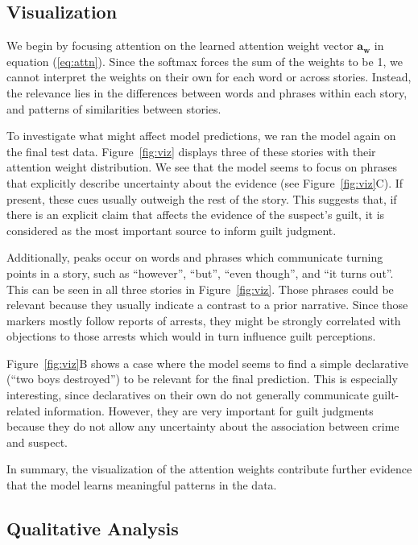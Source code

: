 \documentclass[11pt,a4paper]{article}
\begin{document}
\subsection{Visualization}

We begin by focusing attention on the learned attention weight vector $\mathbf{a_{w}}$ in equation (\ref{eq:attn}). Since the softmax forces the sum of the weights to be 1, we cannot interpret the weights on their own for each word or across stories. Instead, the relevance lies in the differences between words and phrases within each story, and patterns of similarities between stories.

To investigate what might affect model predictions, we ran the model again on the final test data. Figure~\ref{fig:viz} displays three of these stories with their attention weight distribution.
We see that the model seems to focus on phrases that explicitly describe uncertainty about the evidence (see Figure~\ref{fig:viz}C). If present, these cues usually outweigh the rest of the story. This suggests that, if there is an explicit claim that affects the evidence of the suspect's guilt, it is considered as the most important source to inform guilt judgment.

Additionally, peaks occur on words and phrases which communicate turning points in a story, such as ``however'', ``but'', ``even though'', and ``it turns out''. This can be seen in all three stories in Figure~\ref{fig:viz}. Those phrases could be relevant because they usually indicate a contrast to a prior narrative. Since those markers mostly follow reports of arrests, they might be strongly correlated with objections to those arrests which would in turn influence guilt perceptions.

Figure~\ref{fig:viz}B shows a case where the model seems to find a simple declarative (``two boys destroyed'') to be relevant for the final prediction. This is especially interesting, since declaratives on their own do not generally communicate guilt-related information. However, they are very important for guilt judgments because they do not allow any uncertainty about the association between crime and suspect.

In summary, the visualization of the attention weights contribute further evidence that the model learns meaningful patterns in the data.


\subsection{Qualitative Analysis}
\end{document}
